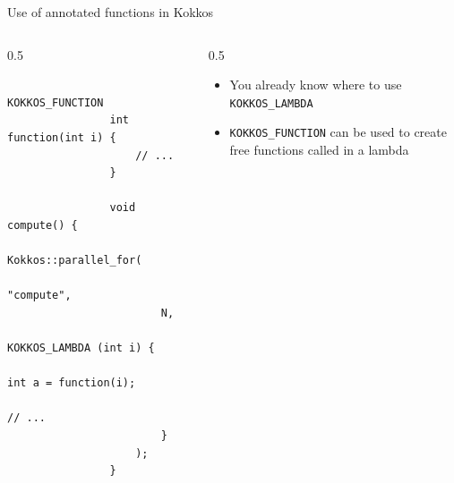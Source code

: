 \documentclass[
    aspectratio=169,
    \createHandout
]{beamer}
\begin{document}
\begin{frame}[fragile]{Use of annotated functions in Kokkos}
    \begin{columns}
        \begin{column}{0.5\linewidth}
            \begin{verbatim}
                KOKKOS_FUNCTION
                int function(int i) {
                    // ...
                }

                void compute() {
                    Kokkos::parallel_for(
                        "compute",
                        N,
                        KOKKOS_LAMBDA (int i) {
                            int a = function(i);
                            // ...
                        }
                    );
                }
            \end{verbatim}
        \end{column}
        \begin{column}{0.5\linewidth}
            \begin{itemize}
                \item You already know where to use \texttt{KOKKOS\_LAMBDA}
                \pause
                \item \texttt{KOKKOS\_FUNCTION} can be used to create free functions called in a lambda
            \end{itemize}
        \end{column}
    \end{columns}
\end{frame}
\end{document}
